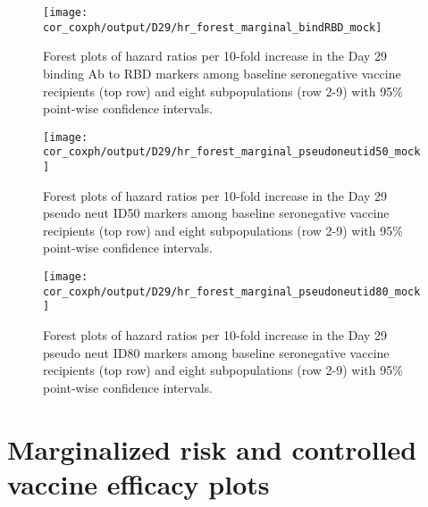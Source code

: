 \documentclass[]{book}
\theoremstyle{definition}
\theoremstyle{definition}
\theoremstyle{definition}
\newcommand{\1}{\mathbbm{1}}
\begin{document}
\begin{figure}[H]
    \centering
    \texttt{[image: cor\_coxph/output/D29/hr\_forest\_marginal\_bindRBD\_mock]}
    \caption{Forest plots of hazard ratios per 10-fold increase in the  Day 29 binding Ab to RBD markers among baseline seronegative vaccine recipients (top row) and eight subpopulations (row 2-9) with 95\% point-wise confidence intervals.}
\end{figure}
\begin{figure}[H]
    \centering
    \texttt{[image: cor\_coxph/output/D29/hr\_forest\_marginal\_pseudoneutid50\_mock]}
    \caption{Forest plots of hazard ratios per 10-fold increase in the  Day 29 pseudo neut ID50 markers among baseline seronegative vaccine recipients (top row) and eight subpopulations (row 2-9) with 95\% point-wise confidence intervals.}
\end{figure}

\begin{figure}[H]
    \centering
    \texttt{[image: cor\_coxph/output/D29/hr\_forest\_marginal\_pseudoneutid80\_mock]}
    \caption{Forest plots of hazard ratios per 10-fold increase in the  Day 29 pseudo neut ID80 markers among baseline seronegative vaccine recipients (top row) and eight subpopulations (row 2-9) with 95\% point-wise confidence intervals.}
\end{figure}
\clearpage

\hypertarget{marginalized-risk-and-controlled-vaccine-efficacy-plots-1}{%
\section{Marginalized risk and controlled vaccine efficacy plots}\label{marginalized-risk-and-controlled-vaccine-efficacy-plots-1}}
\end{document}
